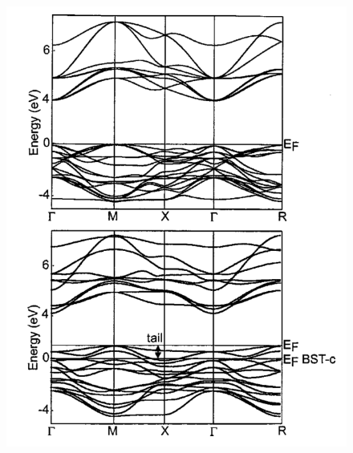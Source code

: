 \documentclass[3p,review,12pt]{elsarticle}
\begin{document}
\begin{figure}[H]
	\centering
	\begin{minipage}[b]{0.45\textwidth}
		\includegraphics[width=\textwidth]{longo1}
	\end{minipage}
	\hfill
	\begin{minipage}[b]{0.45\textwidth}

\end{minipage}
\end{figure}
\end{document}
